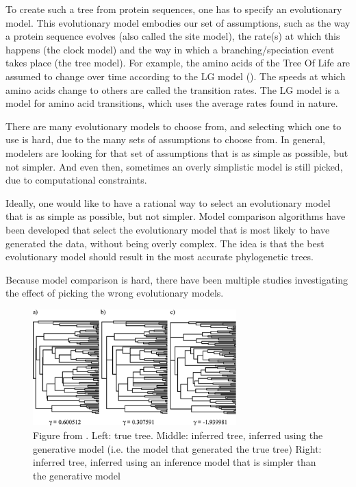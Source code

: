 To create such a tree from protein sequences, one has to specify
an evolutionary model. This evolutionary model embodies our set of
assumptions,
such as the way a protein sequence evolves (also called the site model), 
the rate(s) at which this happens (the clock model) 
and the way in which a branching/speciation event takes 
place (the tree model). 
For example, the amino acids of the Tree Of Life are assumed to change
over time according to the LG model (\cite{le2008improved}).
The speeds at which amino acids change to others are called the transition
rates. The LG model is a model for amino acid transitions, 
which uses the average rates found in nature.

There are many evolutionary models to choose from, 
and selecting which one to use is hard, due to the many sets of assumptions
to choose from. In general, modelers are looking for that set of assumptions
that is as simple as possible, but not simpler. And even then, sometimes
an overly simplistic model is still picked, due to computational 
constraints. 

Ideally, one would like to have a rational way to select 
an evolutionary model that is as simple as possible, but not simpler.
Model comparison algorithms have been developed that select the evolutionary model that is
most likely to have generated the data, without being overly complex.
The idea is that the best evolutionary model should result in the
most accurate phylogenetic trees.

Because model comparison is hard, there have been multiple
studies investigating the effect of picking the wrong
evolutionary models. 

\begin{figure}[H]
  \includegraphics[width=0.7\textwidth]{revell2005under.png}
  \caption{
    Figure from \cite{revell2005under}. Left: true tree. Middle: inferred tree, inferred using the generative model (i.e. the model that generated the true tree)
    Right: inferred tree, inferred using an inference model that is simpler than the generative model
 }
  \label{fig:revell2005under}
\end{figure}


